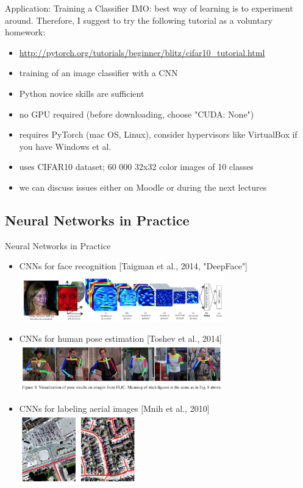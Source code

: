 \documentclass{beamer}
\begin{document}
\begin{frame}{Application: Training a Classifier}
IMO: best way of learning is to experiment around. Therefore, I suggest to try the following tutorial as a voluntary homework:
\begin{itemize}
\item \url{http://pytorch.org/tutorials/beginner/blitz/cifar10_tutorial.html}
\item training of an image classifier with a CNN
\item Python novice skills are sufficient
\item no GPU required (before downloading, choose "CUDA: None")
\item requires PyTorch (mac OS, Linux), consider hypervisors like VirtualBox if you have Windows et al.
\item uses CIFAR10 dataset; 60 000 32x32 color images of 10 classes
\item we can discuss issues either on Moodle or during the next lectures
\end{itemize}
\end{frame}

\subsection{Neural Networks in Practice}
\begin{frame}{Neural Networks in Practice}
\begin{itemize}
\item CNNs for face recognition [Taigman et al., 2014, "DeepFace"]
\includegraphics[width=0.7\textwidth]{cnn_app1}
\item CNNs for human pose estimation [Toshev et al., 2014]\\
\includegraphics[width=0.7\textwidth]{cnn_app2}
\item CNNs for labeling aerial images [Mnih et al., 2010]\\
\includegraphics[width=0.4\textwidth]{cnn_app3}
\end{itemize}
\end{frame}
\end{document}
